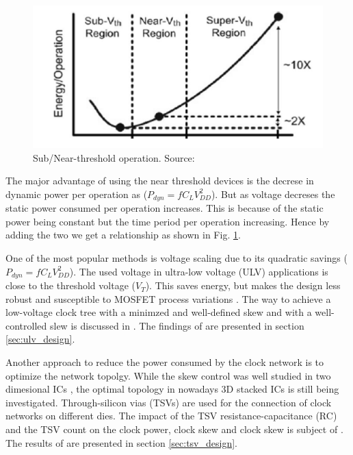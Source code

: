 \documentclass[conference]{IEEEtran}
\begin{document}
\begin{figure}[htbp]
	\includegraphics[width=\linewidth]{img/Pictures/Energy_comparison.png}
	\centering
	\caption{Sub/Near-threshold operation. Source: \cite{b1}}
	\label{fig:Energy_comparison}
\end{figure}

The major advantage of using the near threshold devices is the decrese in
dynamic power per operation as ($P_{dyn}=fC_LV_{DD}^2$). But as voltage
decreses the static power consumed per operation increases. This is because of
the static power being constant but the time period per operation increasing.
Hence by adding the two we get a relationship as shown in Fig.
\ref{fig:Energy_comparison}.



One of the most popular methods is voltage scaling due to its quadratic savings ($P_{dyn}=fC_LV_{DD}^2$). The used voltage in ultra-low voltage (ULV) applications is close to the threshold voltage ($V_T$). This saves energy, but makes the design less robust and susceptible to MOSFET process variations \cite{b6}.
The way to achieve a low-voltage clock tree with a minimzed and well-defined skew and with a well-controlled slew is discussed in \cite{b1}. The findings of \cite{b1} are presented in section \ref{sec:ulv_design}.  

Another approach to reduce the power consumed by the clock network is to optimize the network topolgy. While the skew control was well studied in two dimesional ICs \cite{b7}, the optimal topology in nowadays 3D stacked ICs is still being investigated. Through-silicon vias (TSVs) are used for the connection of clock networks on different dies. The impact of the TSV resistance-capacitance (RC) and the TSV count on the clock power, clock skew and clock skew is subject of \cite{b2}. The results of \cite{b2} are presented in section \ref{sec:tsv_design}.
\end{document}
